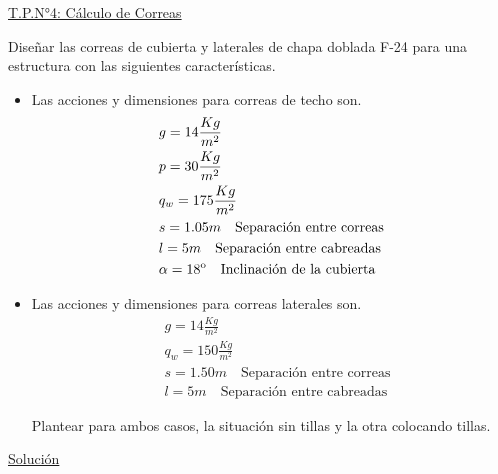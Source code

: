 \begin{center}
\underline{\Large{T.P.N°4: Cálculo de Correas}}
\end{center}

Diseñar las correas de cubierta y laterales de chapa doblada F-24 para una estructura con las siguientes características.
\begin{itemize}
\item Las acciones y dimensiones para correas de techo son.
\begin{align*}
& g=14 \frac{Kg}{m^2} \\
& p=30 \frac{Kg}{m^2} \\
& q_w=175 \frac{Kg}{m^2} \\
& s= 1.05m \quad \text{Separación entre correas} \\
& l= 5m \quad \text{Separación entre cabreadas} \\
& \alpha = 18\textsuperscript{o} \quad \text{Inclinación de la cubierta}
\end{align*}

\item Las acciones y dimensiones para correas laterales son.
\begin{align*}
& g=14 \frac{Kg}{m^2} \\
& q_w=150 \frac{Kg}{m^2} \\
& s= 1.50m \quad \text{Separación entre correas} \\
& l= 5m \quad \text{Separación entre cabreadas}
\end{align*}

Plantear para ambos casos, la situación sin tillas y la otra colocando tillas.
\end{itemize}

\newpage

\begin{center}
\underline{\Large{Solución}}
\end{center}

